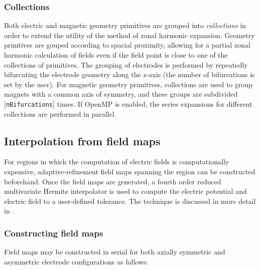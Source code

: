 \documentclass[11pt,a4paper,oneside]{article}
\begin{document}
\subsubsection{Collections}
\label{subsubsec:collections}

Both electric and magnetic geometry primitives are grouped into \emph{collections} in order to extend the utility of the method of zonal harmonic expansion.  Geometry primtives are gouped according to spacial proximity, allowing for a partial zonal harmonic calculation of fields even if the field point is close to one of the collections of primitives.  The grouping of electrodes is performed by repeatedly bifurcating the electrode geometry along the z-axis (the number of bifurcations is set by the user).  For magnetic geometry primitives, collections are used to group magnets with a common axis of symmetry, and these groups are subdivided [\texttt{nBifurcations}] times.  If OpenMP is enabled, the series expansions for different collections are performed in parallel.  

\subsection{Interpolation from field maps}
\label{subsec:fieldMap}

For regions in which the computation of electric fields is computationally expensive, adaptive-refinement field maps spanning the region can be constructed beforehand.  Once the field maps are generated, a fourth order reduced multivariate Hermite interpolator is used to compute the electric potential and electric field to a user-defined tolerance.  The technique is discussed in more detail in \cite{Corona}.  

\subsubsection{Constructing field maps}
\label{subsubsec:constructingFieldMaps}

Field maps may be constructed in serial for both axially symmetric and asymmetric electrode configurations as follows: 
\end{document}
